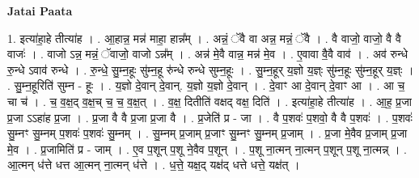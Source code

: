 \documentclass[17pt]{extarticle}
\begin{document}
\textbf{Jatai Paata} \newline

1. इत्या॑हा॒हे तीत्या॑ह । . आ॒हान्न॒ मन्न॑ माहा॒ हान्न᳚म् । . अन्नं॒ ॅवै वा अन्न॒ मन्नं॒ ॅवै । . वै वाजो॒ वाजो॒ वै वै वाजः॑ । . वाजो ऽन्न॒ मन्नं॒ ॅवाजो॒ वाजो ऽन्न᳚म् । . अन्न॑ मे॒वै वान्न॒ मन्न॑ मे॒व । . ए॒वावा वै॒वै वाव॑ । . अव॑ रुन्धे रु॒न्धे ऽवाव॑ रुन्धे । . रु॒न्धे॒ सु॒म्न॒हूः सु॑म्न॒हू रु॑न्धे रुन्धे सुम्न॒हूः । . सु॒म्न॒हूर् य॒ज्ञो य॒ज्ञ्ः सु॑म्न॒हूः सु॑म्न॒हूर् य॒ज्ञ्ः । . सु॒म्न॒हूरिति॑ सुम्न - हूः । . य॒ज्ञो दे॒वान् दे॒वान्. य॒ज्ञो य॒ज्ञो दे॒वान् । . दे॒वाꣳ आ दे॒वान् दे॒वाꣳ आ । . आ च॒ चा च॑ । . च॒ व॒क्ष॒द् व॒क्ष॒च् च॒ च॒ व॒क्ष॒त् । . व॒क्ष॒ दितीति॑ वक्षद् वक्ष॒ दिति॑ । . इत्या॑हा॒हे तीत्या॑ह । . आ॒ह॒ प्र॒जा प्र॒जा ऽऽहा॑ह प्र॒जा । . प्र॒जा वै वै प्र॒जा प्र॒जा वै । . प्र॒जेति॑ प्र - जा । . वै प॒शवः॑ प॒शवो॒ वै वै प॒शवः॑ । . प॒शवः॑ सु॒म्नꣳ सु॒म्नम् प॒शवः॑ प॒शवः॑ सु॒म्नम् । . सु॒म्नम् प्र॒जाम् प्र॒जाꣳ सु॒म्नꣳ सु॒म्नम् प्र॒जाम् । . प्र॒जा मे॒वैव प्र॒जाम् प्र॒जा मे॒व । . प्र॒जामिति॑ प्र - जाम् । . ए॒व प॒शून् प॒शू ने॒वैव प॒शून् । . प॒शू ना॒त्मन् ना॒त्मन् प॒शून् प॒शू ना॒त्मन्न् । . आ॒त्मन् ध॑त्ते धत्त आ॒त्मन् ना॒त्मन् ध॑त्ते । . ध॒त्ते॒ यक्ष॒द् यक्ष॑द् धत्ते धत्ते॒ यक्ष॑त् । \newline
\end{document}
